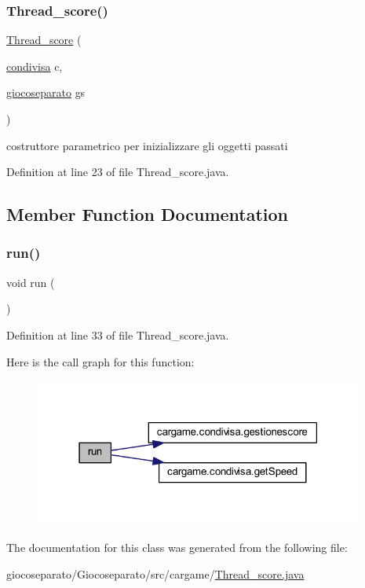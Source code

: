 \subsubsection{\texorpdfstring{Thread\+\_\+score()}{Thread\_score()}}
{\footnotesize\ttfamily \hyperlink{classcargame_1_1_thread__score}{Thread\+\_\+score} (\begin{DoxyParamCaption}\item[{\hyperlink{classcargame_1_1condivisa}{condivisa}}]{c,  }\item[{\hyperlink{classcargame_1_1giocoseparato}{giocoseparato}}]{gs }\end{DoxyParamCaption})}



costruttore parametrico per inizializzare gli oggetti passati 



Definition at line 23 of file Thread\+\_\+score.\+java.



\subsection{Member Function Documentation}
\mbox{\label{classcargame_1_1_thread__score_a13a43e6d814de94978c515cb084873b1}} 
\subsubsection{\texorpdfstring{run()}{run()}}
{\footnotesize\ttfamily void run (\begin{DoxyParamCaption}{ }\end{DoxyParamCaption})}



Definition at line 33 of file Thread\+\_\+score.\+java.

Here is the call graph for this function\+:
\nopagebreak
\begin{figure}[H]
\begin{center}
\leavevmode
\includegraphics[width=307pt]{classcargame_1_1_thread__score_a13a43e6d814de94978c515cb084873b1_cgraph}
\end{center}
\end{figure}


The documentation for this class was generated from the following file\+:\begin{DoxyCompactItemize}
\item 
giocoseparato/\+Giocoseparato/src/cargame/\hyperlink{_thread__score_8java}{Thread\+\_\+score.\+java}\end{DoxyCompactItemize}

